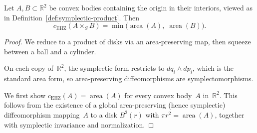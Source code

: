\begin{unverified}
\begin{proposition}%
\label{prop:capacity-symplectic-product}
Let $A, B \subset \mathbb{R}^2$ be convex bodies containing
the origin in their interiors, viewed as in
Definition~\ref{def:symplectic-product}.
Then
\[
  c_{\mathrm{EHZ}}(A \times_S B)
    = \min\!\bigl(\operatorname{area}(A),\;
                   \operatorname{area}(B)\bigr).
\]
\end{proposition}

\begin{proof}
We reduce to a product of disks via an area-preserving
map, then squeeze between a ball and a cylinder.

On each copy of~$\mathbb{R}^2$, the symplectic form
restricts to $dq_i \wedge dp_i$, which is the standard
area form, so area-preserving diffeomorphisms are
symplectomorphisms.

We first show $c_{\mathrm{EHZ}}(A) = \operatorname{area}(A)$
for every convex body~$A$ in~$\mathbb{R}^2$.
This follows from the existence of a global area-preserving
(hence symplectic) diffeomorphism mapping~$A$ to a disk
$B^2(r)$ with $\pi r^2 = \operatorname{area}(A)$,
together with symplectic invariance and normalization.


\end{proof}
\end{unverified}
